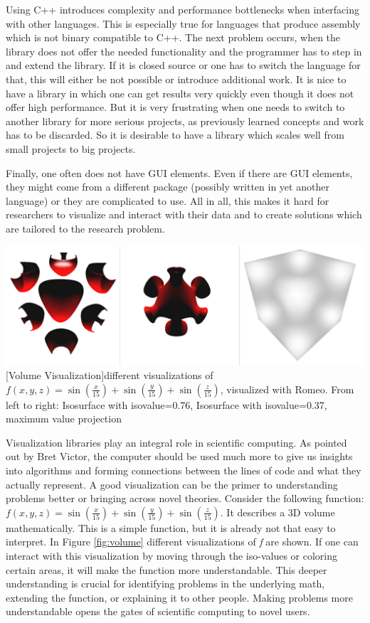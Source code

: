 Using C++ introduces complexity and performance bottlenecks when interfacing with other languages. This is especially true for languages that produce assembly which is not binary compatible to C++. 
The next problem occurs, when the library does not offer the needed functionality and the programmer has to step in and extend the library. 
If it is closed source or one has to switch the language for that, this will either be not possible or introduce additional work.
It is nice to have a library in which one can get results very quickly even though it does not offer high performance. 
But it is very frustrating when one needs to switch to another library for more serious projects, as previously learned concepts and work has to be discarded.
So it is desirable to have a library which scales well from small projects to big projects.

Finally, one often does not have GUI elements. 
Even if there are GUI elements, they might come from a different package (possibly written in yet another language) or they are complicated to use.
All in all, this makes it hard for researchers to visualize and interact with their data and to create solutions which are tailored to the research problem.

\vspace{1em}
\begin{minipage}{\linewidth}
    \centering
    \includegraphics[width=0.7\linewidth]{graphics/surfaces.png}
    [Volume Visualization]{different visualizations of $f(x,y,z)=\sin(\frac{x}{15})+\sin(\frac{y}{15})+\sin(\frac{z}{15})$, visualized with Romeo. From left to right: Isosurface with isovalue=0.76, Isosurface with isovalue=0.37, maximum value projection}
    \label{fig:volume}
\end{minipage}
\vspace{1em}

Visualization libraries play an integral role in scientific computing.
As pointed out by Bret Victor, the computer should be used much more to give us insights into algorithms and forming connections between the lines of code and what they actually represent\cite{BretVictorIventingOnPrinciple}.
A good visualization can be the primer to understanding problems better or bringing across novel theories.
Consider the following function: $f(x,y,z)=\sin(\frac{x}{15})+\sin(\frac{y}{15})+\sin(\frac{z}{15})$. 
It describes a 3D volume mathematically. 
This is a simple function, but it is already not that easy to interpret. In Figure \ref{fig:volume} different visualizations of \textit{f} are shown.
If one can interact with this visualization by moving through the iso-values or coloring certain areas, it will make the function more understandable.
This deeper understanding is crucial for identifying problems in the underlying math, extending the function, or explaining it to other people. 
Making problems more understandable opens the gates of scientific computing to novel users.

